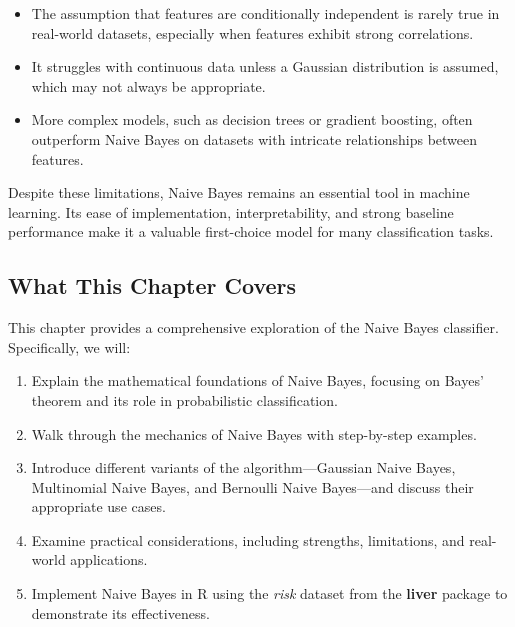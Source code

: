 \documentclass[
  11pt,
]{book}
\providecommand{\tightlist}{%
  \setlength{\itemsep}{0pt}\setlength{\parskip}{0pt}}
\theoremstyle{definition}
\theoremstyle{definition}
\theoremstyle{definition}
\theoremstyle{definition}
\theoremstyle{remark}
\begin{document}
\begin{itemize}
\tightlist
\item
  The assumption that features are conditionally independent is rarely true in real-world datasets, especially when features exhibit strong correlations.\\
\item
  It struggles with continuous data unless a Gaussian distribution is assumed, which may not always be appropriate.\\
\item
  More complex models, such as decision trees or gradient boosting, often outperform Naive Bayes on datasets with intricate relationships between features.
\end{itemize}

Despite these limitations, Naive Bayes remains an essential tool in machine learning. Its ease of implementation, interpretability, and strong baseline performance make it a valuable first-choice model for many classification tasks.

\subsection*{What This Chapter Covers}\label{what-this-chapter-covers}


This chapter provides a comprehensive exploration of the Naive Bayes classifier. Specifically, we will:

\begin{enumerate}
\def\labelenumi{\arabic{enumi}.}
\tightlist
\item
  Explain the mathematical foundations of Naive Bayes, focusing on Bayes' theorem and its role in probabilistic classification.\\
\item
  Walk through the mechanics of Naive Bayes with step-by-step examples.\\
\item
  Introduce different variants of the algorithm---Gaussian Naive Bayes, Multinomial Naive Bayes, and Bernoulli Naive Bayes---and discuss their appropriate use cases.\\
\item
  Examine practical considerations, including strengths, limitations, and real-world applications.\\
\item
  Implement Naive Bayes in R using the \emph{risk} dataset from the \textbf{liver} package to demonstrate its effectiveness.
\end{enumerate}
\end{document}
